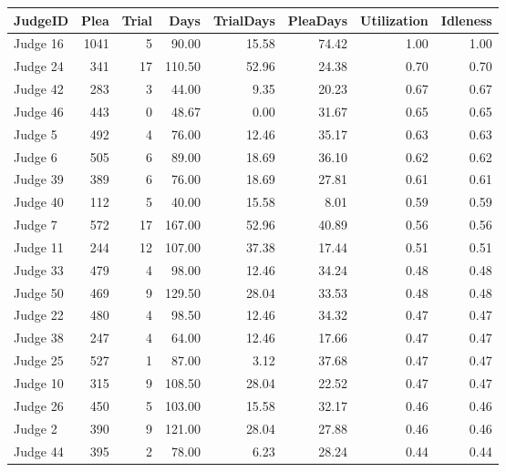\begin{tabular}{lrrrrrrr}
\toprule
 JudgeID &  Plea &  Trial &   Days &  TrialDays &  PleaDays &  Utilization &  Idleness \\
\midrule
Judge 16 &  1041 &      5 &  90.00 &      15.58 &     74.42 &         1.00 &      1.00 \\
Judge 24 &   341 &     17 & 110.50 &      52.96 &     24.38 &         0.70 &      0.70 \\
Judge 42 &   283 &      3 &  44.00 &       9.35 &     20.23 &         0.67 &      0.67 \\
Judge 46 &   443 &      0 &  48.67 &       0.00 &     31.67 &         0.65 &      0.65 \\
 Judge 5 &   492 &      4 &  76.00 &      12.46 &     35.17 &         0.63 &      0.63 \\
 Judge 6 &   505 &      6 &  89.00 &      18.69 &     36.10 &         0.62 &      0.62 \\
Judge 39 &   389 &      6 &  76.00 &      18.69 &     27.81 &         0.61 &      0.61 \\
Judge 40 &   112 &      5 &  40.00 &      15.58 &      8.01 &         0.59 &      0.59 \\
 Judge 7 &   572 &     17 & 167.00 &      52.96 &     40.89 &         0.56 &      0.56 \\
Judge 11 &   244 &     12 & 107.00 &      37.38 &     17.44 &         0.51 &      0.51 \\
Judge 33 &   479 &      4 &  98.00 &      12.46 &     34.24 &         0.48 &      0.48 \\
Judge 50 &   469 &      9 & 129.50 &      28.04 &     33.53 &         0.48 &      0.48 \\
Judge 22 &   480 &      4 &  98.50 &      12.46 &     34.32 &         0.47 &      0.47 \\
Judge 38 &   247 &      4 &  64.00 &      12.46 &     17.66 &         0.47 &      0.47 \\
Judge 25 &   527 &      1 &  87.00 &       3.12 &     37.68 &         0.47 &      0.47 \\
Judge 10 &   315 &      9 & 108.50 &      28.04 &     22.52 &         0.47 &      0.47 \\
Judge 26 &   450 &      5 & 103.00 &      15.58 &     32.17 &         0.46 &      0.46 \\
 Judge 2 &   390 &      9 & 121.00 &      28.04 &     27.88 &         0.46 &      0.46 \\
Judge 44 &   395 &      2 &  78.00 &       6.23 &     28.24 &         0.44 &      0.44 \\

\end{tabular}

